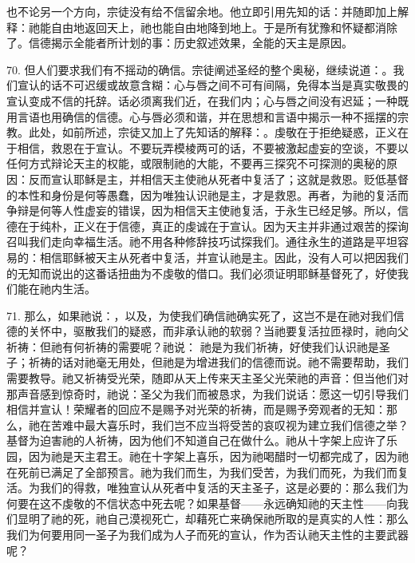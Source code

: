 也不论另一个方向，宗徒没有给不信留余地。他立即引用先知的话：并随即加上解释：祂能自由地返回天上，祂也能自由地降到地上。于是所有犹豫和怀疑都消除了。信德揭示全能者所计划的事：历史叙述效果，全能的天主是原因。\par

70. 但人们要求我们有不摇动的确信。宗徒阐述圣经的整个奥秘，继续说道：。我们宣认的话不可迟缓或故意含糊：心与唇之间不可有间隔，免得本当是真实敬畏的宣认变成不信的托辞。话必须离我们近，在我们内；心与唇之间没有迟延；一种既用言语也用确信的信德。心与唇必须和谐，并在思想和言语中揭示一种不摇摆的宗教。此处，如前所述，宗徒又加上了先知话的解释：。虔敬在于拒绝疑惑，正义在于相信，救恩在于宣认。不要玩弄模棱两可的话，不要被激起虚妄的空谈，不要以任何方式辩论天主的权能，或限制祂的大能，不要再三探究不可探测的奥秘的原因：反而宣认耶稣是主，并相信天主使祂从死者中复活了；这就是救恩。贬低基督的本性和身份是何等愚蠢，因为唯独认识祂是主，才是救恩。再者，为祂的复活而争辩是何等人性虚妄的错误，因为相信天主使祂复活，于永生已经足够。所以，信德在于纯朴，正义在于信德，真正的虔诚在于宣认。因为天主并非通过艰苦的探询召叫我们走向幸福生活。祂不用各种修辞技巧试探我们。通往永生的道路是平坦容易的：相信耶稣被天主从死者中复活，并宣认祂是主。因此，没有人可以把因我们的无知而说出的这番话扭曲为不虔敬的借口。我们必须证明耶稣基督死了，好使我们能在祂内生活。\par

71. 那么，如果祂说：，以及，为使我们确信祂确实死了，这岂不是在祂对我们信德的关怀中，驱散我们的疑惑，而非承认祂的软弱？当祂要复活拉匝禄时，祂向父祈祷：但祂有何祈祷的需要呢？祂说： 祂是为我们祈祷，好使我们认识祂是圣子；祈祷的话对祂毫无用处，但祂是为增进我们的信德而说。祂不需要帮助，我们需要教导。祂又祈祷受光荣，随即从天上传来天主圣父光荣祂的声音：但当他们对那声音感到惊奇时，祂说：圣父为我们而被恳求，为我们说话：愿这一切引导我们相信并宣认！荣耀者的回应不是赐予对光荣的祈祷，而是赐予旁观者的无知：那么，祂在苦难中最大喜乐时，我们岂不应当将受苦的哀叹视为建立我们信德之举？基督为迫害祂的人祈祷，因为他们不知道自己在做什么。祂从十字架上应许了乐园，因为祂是天主君王。祂在十字架上喜乐，因为祂喝醋时一切都完成了，因为祂在死前已满足了全部预言。祂为我们而生，为我们受苦，为我们而死，为我们而复活。为我们的得救，唯独宣认从死者中复活的天主圣子，这是必要的：那么我们为何要在这不虔敬的不信状态中死去呢？如果基督——永远确知祂的天主性——向我们显明了祂的死，祂自己漠视死亡，却藉死亡来确保祂所取的是真实的人性：那么我们为何要用同一圣子为我们成为人子而死的宣认，作为否认祂天主性的主要武器呢？\par

